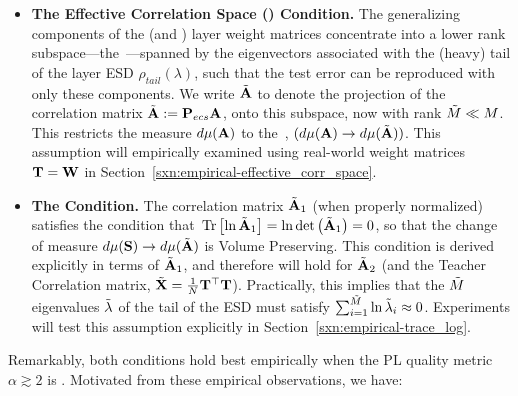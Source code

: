 \begin{itemize}
  \item
  \textbf{The Effective Correlation Space (\ECS) Condition.}
  The generalizing components of the \Student (and \Teacher) layer weight matrices concentrate into a lower rank subspace---the~\ECS---spanned by the
  eigenvectors associated with the (heavy) tail of the layer ESD $\rho_{tail}(\lambda)$, such that the test error can 
  be reproduced with only these components. 
  We write $\tilde{\mathbf{A}}$ to denote the projection of the correlation
  matrix $\tilde{\mathbf{A}}:=\mathbf{P}_{ecs}\mathbf{A}$, onto this subspace, now with rank $\tilde{M}\ll M$.
  This restricts the measure $d\mu(\mathbf{A})$ to the~\ECS, $(d\mu(\mathbf{A})\rightarrow d\mu(\tilde{\mathbf{A}}))$.
  This assumption will empirically examined using real-world \Teacher weight matrices ${\mathbf{T}}={\mathbf{W}}$
  in Section~\ref{sxn:empirical-effective_corr_space}. 
  \item
  \textbf{The \TRACELOG Condition.}
  The \Student correlation matrix $\tilde{\mathbf{A}}_1$ (when properly normalized)
  satisfies the condition that $\mbox{}\operatorname{Tr}\left[\ln\tilde{\mathbf{A}}_1\right]=\ln\mbox{}{\text{det}}\left(\tilde{\mathbf{A}}_1\right)=0$,
  so that the change of measure $d\mu({\mathbf{S}}) \rightarrow d\mu(\tilde{\mathbf{A}}) $ is Volume Preserving.
  This condition is derived explicitly in terms of $\tilde{\mathbf{A}}_1$, and therefore will hold for $\tilde{\mathbf{A}}_2$
  (and the Teacher Correlation matrix, $\tilde{\mathbf{X}}=\frac{1}{N}{\mathbf{T}}^{\top}{\mathbf{T}}$).
  Practically, this implies that the $\tilde{M}$ eigenvalues $\tilde{\lambda}$
  of the tail of the ESD must satisfy $\sum_{i=1}^{\tilde{M}}\ln\tilde{\lambda}_{i}\approx 0$.
  Experiments will test this assumption explicitly in Section~\ref{sxn:empirical-trace_log}.
\end{itemize}
Remarkably, both conditions hold best empirically when the \HTSR PL quality metric $\alpha\gtrsim 2$ is \Ideal. Motivated from these empirical observations, we have:
